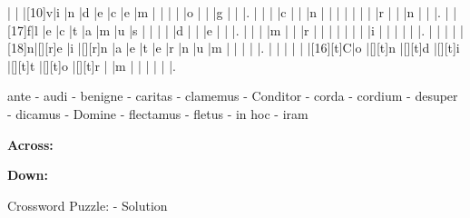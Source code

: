 \documentclass[12pt]{article}
\begin{document}
\begin{Puzzle}{22}{24}
  |{}  |{}  |[10]v|i   |n   |d   |e   |c   |e   |m   |{}  |{}  |{}  |{}  |o   |{}  |{}  |g   |{}  |{}  |.
  |{}  |{}  |{}  |c   |{}  |{}  |n   |{}  |{}  |{}  |{}  |{}  |{}  |{}  |r   |{}  |{}  |n   |{}  |{}  |.
  |{}  |[17]f|l   |e   |c   |t   |a   |m   |u   |s   |{}  |{}  |{}  |{}  |d   |{}  |{}  |e   |{}  |{}  |.
  |{}  |{}  |{}  |m   |{}  |{}  |r   |{}  |{}  |{}  |{}  |{}  |{}  |{}  |i   |{}  |{}  |{}  |{}  |{}  |.
  |{}  |{}  |{}  |{}  |[18]n|[][r]e   |i   |[][r]n   |a   |e   |t   |e   |r   |n   |u   |m   |{}  |{}  |{}  |{}  |.
  |{}  |{}  |{}  |{}  |{}  |[16][t]C|o   |[][t]n   |[][t]d   |[][t]i   |[][t]t   |[][t]o   |[][t]r   |{}  |m   |{}  |{}  |{}  |{}  |{}  |.
\end{Puzzle}
\begin{rotate}{90}
\small 
ante - audi - benigne - caritas - clamemus - Conditor - corda - cordium - desuper - dicamus - Domine - flectamus - fletus - in hoc - iram
\end{rotate}
\hspace{-10pt}
\begin{PuzzleClues}{\textbf{Across:}}
\end{PuzzleClues}
\begin{PuzzleClues}{\textbf{Down:}}
\end{PuzzleClues}
\newpage
\begin{center}
  \huge{Crossword Puzzle: - Solution}
\end{center}
\vspace{1.5cm}
\PuzzleSolution
\end{document}
